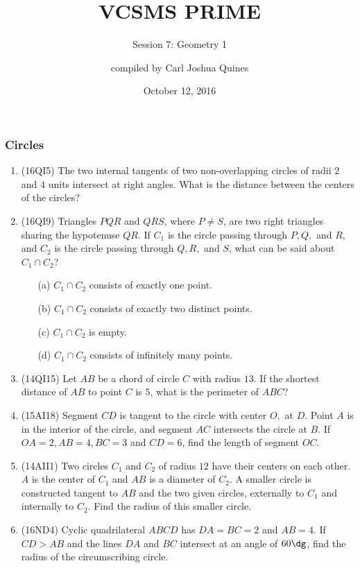 \documentclass[10pt,paper=letter]{scrartcl}
\begin{document}
\title{VCSMS PRIME}
\subtitle{Session 7: Geometry 1}
\author{compiled by Carl Joshua Quines}
\date{October 12, 2016}

\maketitle

\subsubsection*{Circles}

\begin{enumerate}

\item (16QI5) The two internal tangents of two non-overlapping circles of radii $2$ and $4$ units intersect at right angles. What is the distance between the centers of the circles?

\item (16QI9) Triangles $PQR$ and $QRS$, where $P \neq S$, are two right triangles sharing the hypotenuse $QR$. If $C_1$ is the circle passing through $P, Q,$ and $R,$ and $C_2$ is the circle passing through $Q, R,$ and $S$, what can be said about $C_1 \cap C_2$?

\begin{enumerate}

\item[(a)] $C_1 \cap C_2$ consists of exactly one point.
\item[(b)] $C_1 \cap C_2$ consists of exactly two distinct points.
\item[(c)] $C_1 \cap C_2$ is empty.
\item[(d)] $C_1 \cap C_2$ consists of infinitely many points.

\end{enumerate}

\item (14QI15) Let $AB$ be a chord of circle $C$ with radius $13$. If the shortest distance of $AB$ to point $C$ is $5$, what is the perimeter of $ABC$?

\item (15AI18) Segment $CD$ is tangent to the circle with center $O,$ at $D$. Point $A$ is in the interior of the circle, and segment $AC$ intersects the circle at $B$. If $OA = 2, AB = 4, BC = 3$ and $CD = 6$, find the length of segment $OC$.

\item (14AII1) Two circles $C_1$ and $C_2$ of radius $12$ have their centers on each other. $A$ is the center of $C_1$ and $AB$ is a diameter of $C_2$. A smaller circle is constructed tangent to $AB$ and the two given circles, externally to $C_1$ and internally to $C_2$. Find the radius of this smaller circle.

\item (16ND4) Cyclic quadrilateral $ABCD$ has $DA = BC = 2$ and $AB = 4$. If $CD > AB$ and the lines $DA$ and $BC$ intersect at an angle of $60\dg$, find the radius of the circumscribing circle.

\end{enumerate}
\end{document}
